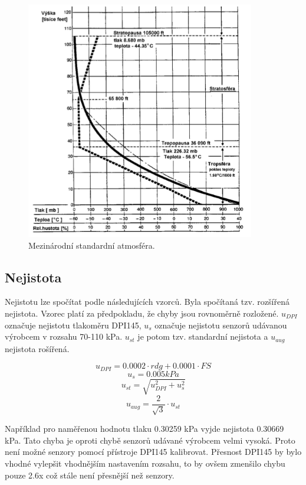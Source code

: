 \documentclass[12pt,a4paper,oneside]{article}
\begin{document}
\begin{figure} [htbp]
\centering
\includegraphics [width=100mm, origin=c] {./img/graf.png}
\caption{Mezinárodní standardní atmosféra.}
\label{MSA}
\end{figure}

\subsection{Nejistota}
Nejistotu lze spočítat podle následujících vzorců. Byla spočítaná tzv. rozšířená nejistota. Vzorec platí za předpokladu, že chyby jsou rovnoměrně rozložené.
$u_{DPI}$ označuje nejistotu tlakoměru DPI145, $u_s$ označuje nejistotu senzorů udávanou výrobcem v rozsahu 70-110 kPa. $u_{st}$ je potom tzv. standardní nejistota a $u_{aug}$ nejistota rošířená.

\begin{equation}
u_{DPI} = 0.0002 \cdot rdg + 0.0001 \cdot FS
\end{equation}
\begin{equation}
u_{s} = 0.005 kPa
\end{equation}
\begin{equation}
u_{st} = \sqrt{u_{DPI}^{2}+u_{s}^{2}}
\end{equation}
\begin{equation}
u_{aug} = \frac{2}{\sqrt{3}} \cdot u_{st}
\end{equation}

Například pro naměřenou hodnotu tlaku 0.30259 kPa vyjde nejistota 0.30669 kPa. Tato chyba je oproti chybě senzorů udávané výrobcem velmi vysoká. Proto není možné senzory pomocí přístroje DPI145 kalibrovat. Přesnost DPI145 by bylo vhodné vylepšit vhodnějším nastavením rozsahu, to by ovšem zmenšilo chybu pouze 2.6x což stále není přesnější než senzory.
\end{document}
